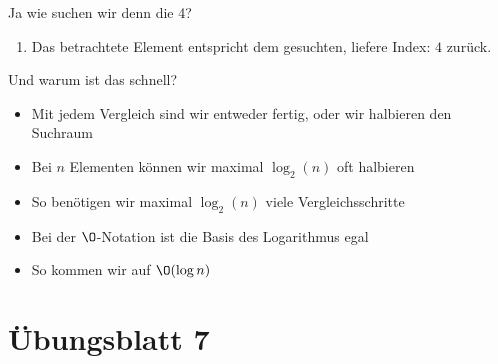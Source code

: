 \begin{frame}[c]{Ja wie suchen wir denn die 4?}
\begin{onlyenv}
\begin{enumerate}
    \item<handout:3> Das betrachtete Element entspricht dem gesuchten, liefere Index: \(4\) zurück.
\end{enumerate}
\end{onlyenv}
\end{frame}

\begin{frame}{Und warum ist das schnell?}
    \begin{itemize}[<+(1)->]
        \itemsep10pt
        \item Mit jedem Vergleich sind wir entweder fertig, oder wir halbieren den Suchraum
        \item Bei \(n\) Elementen können wir maximal \(\log_2(n)\) oft halbieren 
        \item So benötigen wir maximal \(\log_2(n)\) viele Vergleichsschritte
        \item Bei der \(\O\)-Notation ist die Basis des Logarithmus egal
        \item So kommen wir auf \(\O(\log n)\)
    \end{itemize}
\end{frame}

\section{Übungsblatt 7}

